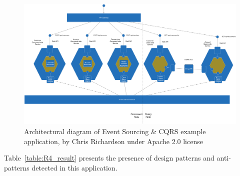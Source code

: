 \documentclass{Configuration_Files/PoliMi3i_thesis}
\begin{document}
\begin{figure}[H]
\centering
\includegraphics[width=1\textwidth]{myImages/R4.png}
\caption{Architectural diagram of Event Sourcing \& CQRS example application, by Chris Richardson under Apache 2.0 license}
\label{fig:R4_arch}
\end{figure}

Table~\ref{table:R4_result} presents the presence of design patterns and anti-patterns detected in this application.
\end{document}
